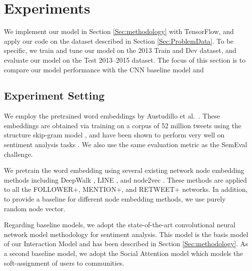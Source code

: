 

\section{Experiments}
We implement our model in Section \ref{Sec:methodology} with TensorFlow, 
and apply our code on the dataset described in Section \ref{Sec:ProblemData}. 
To be specific, we train and tune our model on the 2013 Train and Dev dataset, 
and evaluate our model on the Test 2013--2015 dataset. The focus of this section 
is to compare our model performance with the CNN baseline model and 

\subsection{Experiment Setting}
We employ the pretrained word embeddings by Austudillo et al.\ \cite{astudillo2015learning}. 
These embeddings are obtained via training on a corpus of 52 million tweets
using the structure skip-gram model \cite{ling2015two}, and have been shown to
perform very well on sentiment analysis tasks \cite{yang2017attention}.
We also use the same evaluation metric as the SemEval challenge.

We pretrain the word embedding using several existing network node embedding methods 
including DeepWalk \cite{perozzi2014deepwalk}, LINE \cite{tang2015line}, 
and node2vec \cite{grover2016node2vec}. These methods are applied to all the FOLLOWER+,
MENTION+, and RETWEET+ networks. In addition, to provide a baseline for different node embedding methods, 
we use purely random node vector.



Regarding baseline models, we adopt the state-of-the-art convolutional neural network model
methodology for sentiment analysis. This model is the basis model of our Interaction Model and
has been described in Section \ref{Sec:methodology}. As a second baseline model, we adopt
the Social Attention model \cite{yang2017attention} which models the soft-assignment of
users to communities. 



